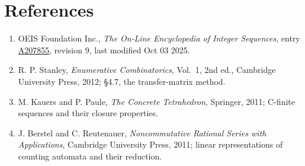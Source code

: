 \documentclass[11pt]{article}
\theoremstyle{definition}
\begin{document}
\section{References}

\begin{enumerate}

\item OEIS Foundation Inc., \emph{The On-Line Encyclopedia of Integer Sequences}, entry \href{https://oeis.org/A207855}{A207855}, revision 9, last modified Oct 03 2025.

\item R. P. Stanley, \emph{Enumerative Combinatorics}, Vol.~1, 2nd ed., Cambridge University Press, 2012; \S4.7, the transfer-matrix method.

\item M. Kauers and P. Paule, \emph{The Concrete Tetrahedron}, Springer, 2011; C-finite sequences and their closure properties.

\item J. Berstel and C. Reutenauer, \emph{Noncommutative Rational Series with Applications}, Cambridge University Press, 2011; linear representations of counting automata and their reduction.

\end{enumerate}
\end{document}
